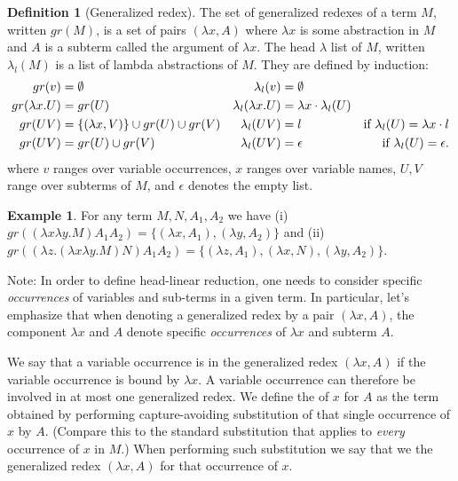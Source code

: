 \documentclass{article}
\theoremstyle{plain}
\theoremstyle{definition}
\newtheorem{definition}{Definition}[section]
\newtheorem{example}{Example}[section]
\theoremstyle{remark}
\begin{document}
\begin{definition}[Generalized redex]
\label{dfn:generalized_redex}
The set of generalized redexes of a term $M$, written $gr(M)$, is a set of pairs $(\lambda x, A)$ where $\lambda x$ is some abstraction in $M$ and $A$ is a subterm called the argument of $\lambda x$. The head $\lambda$ list of $M$, written $\lambda_l(M)$ is a list of lambda abstractions of $M$. They are defined by induction:
\begin{align*}
gr(v) &= \emptyset & \lambda_l(v) &= \emptyset\\
gr(\lambda x. U) &= gr(U) & \lambda_l(\lambda x. U) &= \lambda x \cdot \lambda_l(U) \\
gr(U V) &= \{ (\lambda x, V) \} \cup gr(U) \cup gr(V) &
\lambda_l(U V) &= l & \mbox{if $\lambda_l(U) = \lambda x \cdot l$} \\
gr(U V) &= gr(U) \cup gr(V) & \lambda_l(U V) &= \epsilon & \mbox{if $\lambda_l(U) = \epsilon$.} \\
\end{align*}
where $v$ ranges over variable occurrences, $x$ ranges over variable names, $U, V$ range over subterms of $M$, and $\epsilon$ denotes the empty list.
\end{definition}

\begin{example} For any term $M, N, A_1, A_2$ we have
(i) $gr((\lambda x \lambda y . M) A_1 A_2) = \{ (\lambda x, A_1), (\lambda y, A_2)\}$ and
(ii) $gr((\lambda z . (\lambda x \lambda y . M) N) A_1 A_2) = \{ (\lambda z, A_1), (\lambda x, N), (\lambda y, A_2)\}$.
\end{example}

Note: In order to define head-linear reduction, one needs to consider specific \emph{occurrences} of variables and sub-terms in a given term. In particular, let's emphasize that when denoting a generalized redex by a pair $(\lambda x, A)$, the component $\lambda x$ and $A$ denote specific \emph{occurrences} of $\lambda x$ and subterm $A$.

We say that a variable occurrence is  in the generalized redex $(\lambda x, A)$ if the variable occurrence is bound by $\lambda x$. A variable occurrence can therefore be involved in at most one generalized redex. We define the  of $x$ for $A$ as the term obtained by performing capture-avoiding substitution of that single occurrence of $x$ by $A$. (Compare this to the standard substitution that applies to \emph{every} occurrence of $x$ in $M$.) When performing such substitution we say that we  the generalized redex $(\lambda x, A)$ for that occurrence of $x$.
\end{document}
